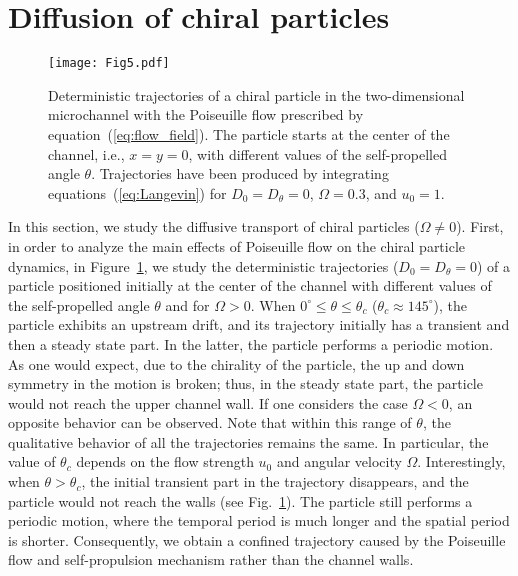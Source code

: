 \documentclass[aps,pre,preprint,superscriptaddress,amsmath,amssymb,nofootinbib]{revtex4}
\begin{document}
\section{Diffusion of chiral particles}\label{Chiral} 

\begin{figure}[htb!]
\centering
\texttt{[image: Fig5.pdf]}
\caption{Deterministic trajectories of a chiral particle in the two-dimensional microchannel with the Poiseuille flow prescribed by equation~(\ref{eq:flow_field}). The particle starts at the center of the channel, i.e., $x = y = 0$, with different values of the self-propelled angle $\theta$. Trajectories have been produced by integrating equations~(\ref{eq:Langevin}) for $D_0 = D_\theta = 0$, $\Omega = 0.3$, and $u_0 = 1$.}
\label{fig:graph5}
\end{figure}



In this section, we study the diffusive transport of chiral particles ($\Omega \neq 0$). 
First, in order to analyze the main effects of Poiseuille flow on the chiral particle dynamics, in Figure~\ref{fig:graph5}, we study the deterministic trajectories ($D_0 = D_{\theta} = 0$) of a particle positioned initially at the center of the channel with different values of the self-propelled angle $\theta$ and for $\Omega > 0$.
When $0^{\circ} \leq \theta \leq \theta_c$ ($\theta_c \approx 145^{\circ}$), the particle exhibits an upstream drift, and its trajectory initially has a transient and then a steady state part.
In the latter, the particle performs a periodic motion.
As one would expect, due to the chirality of the particle, the up and down symmetry in the motion is broken; thus, in the steady state part, the particle would not reach the upper channel wall.
If one considers the case $\Omega < 0$,  an opposite behavior can be observed. 
Note that within this range of $\theta$, the qualitative behavior of all the trajectories remains the same. 
In particular, the value of $\theta_c$ depends on the flow strength $u_0$ and angular velocity $\Omega$. 
Interestingly, when $\theta > \theta_c$, the initial transient part in the trajectory disappears, and the particle would not reach the walls (see Fig.~\ref{fig:graph5}). 
The particle still performs a periodic motion, where the temporal period is much longer and the spatial period is shorter. 
Consequently, we obtain a confined trajectory caused by the Poiseuille flow and self-propulsion mechanism rather than the channel walls.
\end{document}
